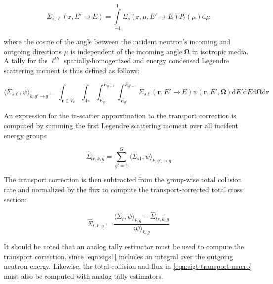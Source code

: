 \begin{equation}
\label{eqn:scatt-moment}
\Sigma_{s,\ell}(\mathbf{r},E'\rightarrow E) = \displaystyle\int\limits_{-1}^{1} \Sigma_{s}(\mathbf{r},\mu,{E'\rightarrow E})P_{\ell}(\mu)\mathrm{d}\mu
\end{equation}

\noindent where the cosine of the angle between the incident neutron's incoming and outgoing directions $\mu$ is independent of the incoming angle $\mathbf{\Omega}$ in isotropic media. A tally for the $\ell^{th}$ spatially-homogenized and energy condensed Legendre scattering moment is thus defined as follows:

\begin{equation}
\label{eqn:flux-weight-scatt-moment}
\langle \Sigma_{s\ell}, \psi \rangle_{k,g'\rightarrow g} = \int_{\mathbf{r} \in V_{k}} \int_{4\pi} \int_{E_{g}}^{E_{g-1}} \int_{E_{g'}}^{E_{g'-1}} \Sigma_{s\ell}(\mathbf{r},E'\rightarrow E)\psi(\mathbf{r},E',\mathbf{\Omega}) \mathrm{d}E'\mathrm{d}E\mathrm{d}\mathbf{\Omega}\mathrm{d}\mathbf{r}
\end{equation}

An expression for the in-scatter approximation\cite{yamamoto2008simplified} to the transport correction is computed by summing the first Legendre scattering moment over all incident energy groups:

\begin{equation}
\label{eqn:transport-corr-macro}
\hat{\Sigma}_{tr,k,g} = \displaystyle\sum\limits_{g'=1}^{G} \langle{\Sigma_{s1}, \psi \rangle_{k,g'\rightarrow g}}
\end{equation}

\noindent The transport correction is then subtracted from the group-wise total collision rate and normalized by the flux to compute the transport-corrected total cross section:

\begin{equation}
\label{eqn:sigt-transport-macro}
\hat{\Sigma}_{t,k,g} = \frac{\langle \Sigma_{t}, \psi \rangle_{k,g} - \hat{\Sigma}_{tr,k,g}}{\langle \psi \rangle_{k,g}}
\end{equation}

It should be noted that an analog tally estimator must be used to compute the transport correction, since \cref{eqn:sigs1} includes an integral over the outgoing neutron energy. Likewise, the total collision and flux in \cref{eqn:sigt-transport-macro} must also be computed with analog tally estimators.

